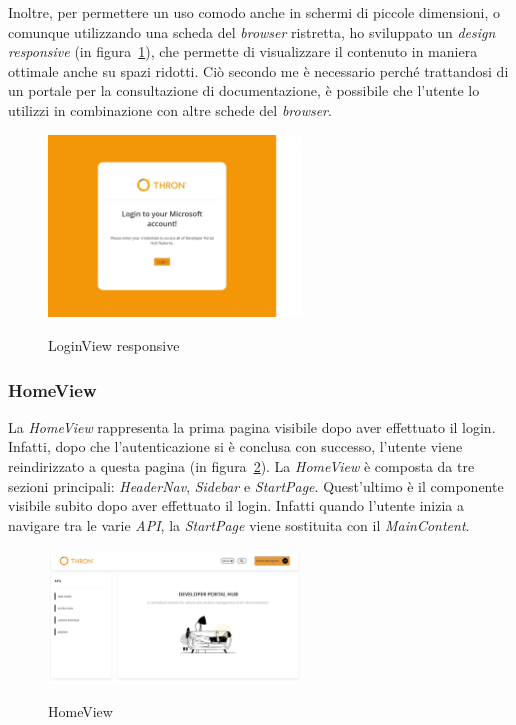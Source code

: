 Inoltre, per permettere un uso comodo anche in schermi di piccole dimensioni, o comunque utilizzando una scheda del \textit{browser} ristretta, ho sviluppato
un \textit{design responsive} (in figura~\ref{fig:login-view-responsive}), che permette di visualizzare il contenuto in maniera ottimale anche su spazi ridotti.
Ciò secondo me è necessario perché trattandosi di un portale per la consultazione di documentazione, è possibile che l'utente 
lo utilizzi in combinazione con altre schede del \textit{browser}.

\begin{figure}[ht]
  \centering
  \includegraphics[width=0.6\textwidth, alt={Pagina di login responsive dell'applicazione}]{images/frontend/LoginViewRes.jpg}
  \caption{LoginView responsive}\label{fig:login-view-responsive}
\end{figure}
\pagebreak

\subsubsection{HomeView}\label{subsubsec:home-view}
La \textit{HomeView} rappresenta la prima pagina visibile dopo aver effettuato il login. Infatti, dopo che l'autenticazione si è conclusa con successo,
l'utente viene reindirizzato a questa pagina (in figura~\ref{fig:home-view}).
La \textit{HomeView} è composta da tre sezioni principali: \textit{HeaderNav}, \textit{Sidebar} e \textit{StartPage}. Quest'ultimo è il componente visibile 
subito dopo aver effettuato il login. Infatti quando l'utente inizia a navigare tra le varie \textit{API}, la \textit{StartPage} viene sostituita con il \textit{MainContent}.

\begin{figure}[ht]
  \centering
  \includegraphics[width=0.6\textwidth, alt={Pagina principale dell'applicazione}]{images/frontend/HomeView.jpg}
  \caption{HomeView}\label{fig:home-view}
\end{figure}

